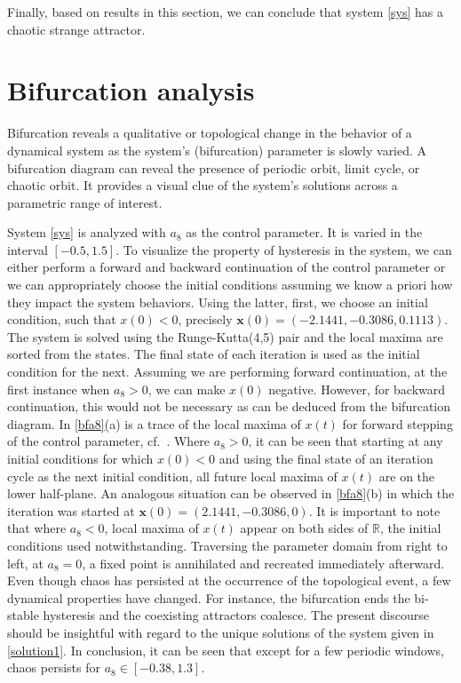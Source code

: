 \documentclass[final,5p,times,twocolumn]{elsarticle}
\begin{document}
Finally, based on results in this section, we can conclude that system \eqref{sys} has a chaotic strange attractor. 

\section{Bifurcation analysis\label{secbifur}}
Bifurcation reveals a qualitative or topological change in the behavior of a dynamical system as the system's (bifurcation) parameter is slowly varied. A bifurcation diagram can reveal the presence of periodic orbit, limit cycle, or chaotic orbit. It provides a visual clue of the system's solutions across a parametric range of interest.  

System \eqref{sys} is analyzed with $a_8$ as the control parameter. It is varied in the interval $[-0.5,1.5]$. To visualize the property of hysteresis in the system, we can either perform a forward and backward continuation of the control parameter or we can appropriately choose the initial conditions assuming we know a priori how they impact the system behaviors. Using the latter, first, we choose an initial condition, such that $x(0)<0$, precisely $\bm{x}(0)=(-2.1441,-0.3086,0.1113)$. The system is solved using the Runge-Kutta(4,5) pair and the local maxima are sorted from the states. The final state of each iteration is used as the initial condition for the next. Assuming we are performing forward continuation, at the first instance when $a_8>0$, we can make $x(0)$ negative. However, for backward continuation, this would not be necessary as can be deduced from the bifurcation diagram. In \cref{bfa8}{(a)}  is a trace of the local maxima of $x(t)$ for forward stepping of the control parameter, cf.~\cite{lai2016research}. Where $a_8>0$, it can be seen that starting at any initial conditions for which $x(0)<0$ and using the final state of an iteration cycle as the next initial condition, all future local maxima of $x(t)$ are on the lower half-plane. An analogous situation can be observed in \cref{bfa8}{(b)} in which the iteration was started at $\bm{x}(0)=(2.1441,-0.3086,0)$. It is important to note that where $a_8<0$, local maxima of $x(t)$ appear on both sides of $\mathbb{R}$, the initial conditions used notwithstanding. Traversing the parameter domain from right to left, at $a_8=0$, a fixed point is annihilated and recreated immediately afterward. Even though chaos has persisted at the occurrence of the topological event, a few dynamical properties have changed. For instance, the bifurcation ends the bi-stable hysteresis and the coexisting attractors coalesce. The present discourse should be insightful with regard to the unique solutions of the system given in \cref{solution1}. In conclusion, it can be seen that except for a few periodic windows, chaos persists for $a_8\in{[-0.38,1.3]}$.
\end{document}
